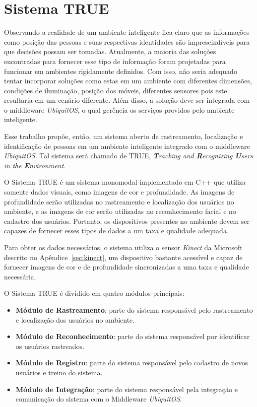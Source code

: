 \chapter{Sistema TRUE}

Observando a realidade de um ambiente inteligente fica claro que as informações como posição das pessoas e suas respectivas identidades são imprescindíveis para que decisões possam ser tomadas. Atualmente, a maioria das soluções encontradas para fornecer esse tipo de informação foram projetadas para funcionar em ambientes rigidamente definidos. Com isso, não seria adequado tentar incorporar soluções como estas em um ambiente com diferentes dimensões, condições de iluminação, posição dos móveis, diferentes sensores pois este resultaria em um cenário diferente. Além disso, a solução deve ser integrada com o middleware \textit{UbiquitOS}, o qual gerência os serviços providos pelo ambiente inteligente.

Esse trabalho propõe, então, um sistema aberto de rastreamento, localização e identificação de pessoas em um ambiente inteligente integrado com o middleware \textit{UbiquitOS}. Tal sistema será chamado de TRUE, \textit{\textbf{T}racking and \textbf{R}ecognizing \textbf{U}sers in the \textbf{E}nvironment}.

O Sistema TRUE é um sistema monomodal implementado em C++ que utiliza somente dados visuais, como imagens de cor e profundidade. As imagens de profundidade serão utilizadas no rastreamento e localização dos usuários no ambiente, e as imagens de cor serão utilizadas no reconhecimento facial e no cadastro dos usuários. Portanto, os dispositivos presentes no ambiente devem ser capazes de fornecer esses tipos de dados a um taxa e qualidade adequada. 

Para obter os dados necessários, o sistema utiliza o sensor \textit{Kinect} da Microsoft descrito no Apêndice~\ref{sec:kinect}, um dispositivo bastante acessível e capaz de fornecer imagens de cor e de profundidade sincronizadas a uma taxa e qualidade necessária.

O Sistema TRUE é dividido em quatro módulos principais:


	\begin{itemize}
		\item \textbf{Módulo de Rastreamento}: parte do sistema responsável pelo rastreamento e localização dos usuários no ambiente.
		\item \textbf{Módulo de Reconhecimento}: parte do sistema responsável por identificar os usuários rastreados.
		\item \textbf{Módulo de Registro}: parte do sistema responsável pelo cadastro de novos usuários e treino do sistema.
		\item \textbf{Módulo de Integração}: parte do sistema responsável pela integração e comunicação do sistema com o Middleware \textit{UbiquitOS}.
	\end{itemize}

